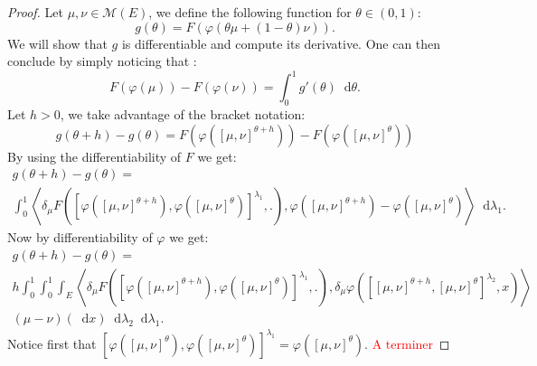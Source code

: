 \documentclass[11pt,a4paper]{article}
\newcommand{\MC}{\mathcal{M}}
\newcommand{\red}[1]{\textcolor{red}{#1}}
\newcommand{\brac}[1]{\left\langle#1\right\rangle}
\newcommand{\dd}{\mathop{}\!\mathrm{d}}
\begin{document}
\begin{proof}
    Let $\mu,\nu \in \MC(E)$, we define the following function for $\theta \in (0,1)$:
    \[
        g(\theta) =  F\left(\varphi(\theta\mu + (1 - \theta)\nu)\right).
    \]
    We will show that $g$ is differentiable and compute its derivative. One can then conclude by simply noticing that :
    \[ F(\varphi(\mu)) - F(\varphi(\nu)) = \int_0^1 g'(\theta) \dd \theta.\]
    Let $h > 0$, we take advantage of the bracket notation:
    \[ 
    g(\theta + h) - g(\theta) = F\left(\varphi\left([\mu,\nu]^{\theta + h}\right)\right) -F\left(\varphi\left([\mu,\nu]^{\theta}\right)\right)
    \]
    By using the differentiability of $F$ we get:
    \begin{multline*}
    g(\theta + h) - g(\theta) =\\ \int_0^1 \brac{\delta_\mu F\left(\left[\varphi\left([\mu,\nu]^{\theta + h}\right),\varphi\left([\mu,\nu]^{\theta}\right)\right]^{\lambda_1}, . \right),\varphi\left([\mu,\nu]^{\theta + h}\right) - \varphi\left([\mu,\nu]^{\theta}\right)} \dd \lambda_1.
    \end{multline*}
    Now by differentiability of $\varphi$ we get:
    \begin{multline*}
        g(\theta + h) - g(\theta) =\\
        h\int_0^1 \int_0^1\int_E \brac{\delta_\mu F\left(\left[\varphi\left([\mu,\nu]^{\theta + h}\right),\varphi\left([\mu,\nu]^{\theta}\right)\right]^{\lambda_1}, . \right),\delta_\mu \varphi\left(\left[ [\mu,\nu]^{\theta + h}, [\mu,\nu]^{\theta }\right]^{\lambda_2} ,x\right)}
        \\
        (\mu-\nu)(\dd x) \dd \lambda_2 \dd \lambda_1. 
    \end{multline*}
    Notice first that \(\left[\varphi\left([\mu,\nu]^{\theta}\right),\varphi\left([\mu,\nu]^{\theta}\right)\right]^{\lambda_1} = \varphi\left([\mu,\nu]^{\theta}\right)\).
    \red{A terminer}
\end{proof}
\end{document}

